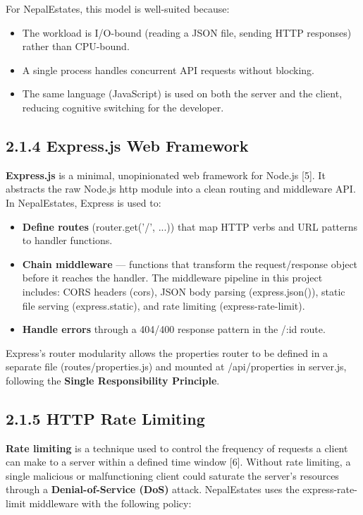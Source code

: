 \documentclass[12pt,a4paper]{report}
\begin{document}
For NepalEstates, this model is well-suited because:

\begin{itemize}
  \item \textbullet{} The workload is I/O-bound (reading a JSON file, sending HTTP responses) rather than CPU-bound.
  \item \textbullet{} A single process handles concurrent API requests without blocking.
  \item \textbullet{} The same language (JavaScript) is used on both the server and the client, reducing cognitive switching for the developer.
\end{itemize}
\subsection{2.1.4 Express.js Web Framework}
\textbf{Express.js} is a minimal, unopinionated web framework for Node.js [5]. It abstracts the raw Node.js http module into a clean routing and middleware API. In NepalEstates, Express is used to:

\begin{itemize}
  \item \textbullet{} \textbf{Define routes} (router.get('/', ...)) that map HTTP verbs and URL patterns to handler functions.
  \item \textbullet{} \textbf{Chain middleware} --- functions that transform the request/response object before it reaches the handler. The middleware pipeline in this project includes: CORS headers (cors), JSON body parsing (express.json()), static file serving (express.static), and rate limiting (express-rate-limit).
  \item \textbullet{} \textbf{Handle errors} through a 404/400 response pattern in the /:id route.
\end{itemize}
Express's router modularity allows the properties router to be defined in a separate file (routes/properties.js) and mounted at /api/properties in server.js, following the \textbf{Single Responsibility Principle}.

\subsection{2.1.5 HTTP Rate Limiting}
\textbf{Rate limiting} is a technique used to control the frequency of requests a client can make to a server within a defined time window [6]. Without rate limiting, a single malicious or malfunctioning client could saturate the server's resources through a \textbf{Denial-of-Service (DoS)} attack. NepalEstates uses the express-rate-limit middleware with the following policy:
\end{document}
